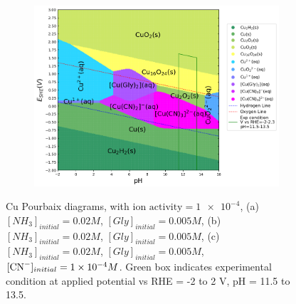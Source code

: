 \documentclass[journal=jacsat,manuscript=article]{achemso}
\begin{document}
\begin{figure}[htbp]
\begin{subfigure}[b]{0.3\textwidth}
    \end{subfigure}
    \begin{subfigure}[b]{0.3\textwidth}
        \subcaption{}\label{fig:Cu_Pourbaix_NH3_Gly_CN}
        \includegraphics[width=\textwidth]{Figures/pourbaix_diagrams/Cu-NH3-H2O_activity=1e-04_[NH3]=0.02M_[Gly]=0.005M_[CN]=0.0001.png}
        \par\medskip   
    \end{subfigure}

    \caption{Cu Pourbaix diagrams, with $\text{ion activity}=\num{1e-4}$, (a)$[NH_3]_{initial}= 0.02M$, $[Gly]_{initial}=0.005M$, (b)$[NH_3]_{initial}= 0.02M$, $[Gly]_{initial}=0.005M$, (c)$[NH_3]_{initial}= 0.02M$, $[Gly]_{initial}=0.005M$, $[\ce{CN-}]_{initial}=\num{1e-4}M$. Green box indicates experimental condition at applied potential vs RHE = -2 to 2 V, pH = 11.5 to 13.5.}
    \label{fig:Cu_Pourbaix}
\end{figure}
\end{document}
